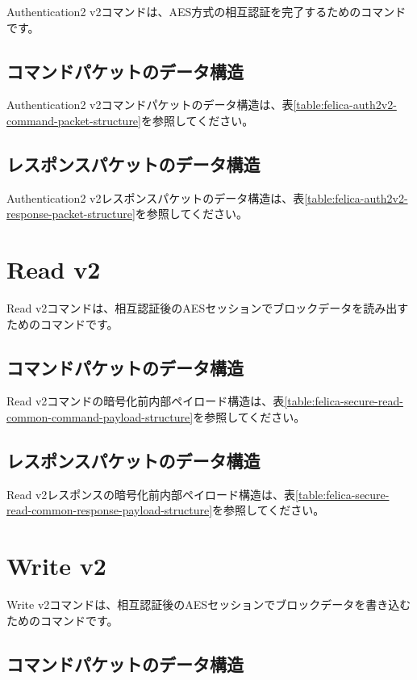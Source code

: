 \documentclass[a4paper]{report}
\begin{document}
Authentication2 v2コマンドは、AES方式の相互認証を完了するためのコマンドです。

\subsection{コマンドパケットのデータ構造}

Authentication2 v2コマンドパケットのデータ構造は、表\ref{table:felica-auth2v2-command-packet-structure}を参照してください。

\subsection{レスポンスパケットのデータ構造}

Authentication2 v2レスポンスパケットのデータ構造は、表\ref{table:felica-auth2v2-response-packet-structure}を参照してください。

\section{Read v2}

Read v2コマンドは、相互認証後のAESセッションでブロックデータを読み出すためのコマンドです。

\subsection{コマンドパケットのデータ構造}

Read v2コマンドの暗号化前内部ペイロード構造は、表\ref{table:felica-secure-read-common-command-payload-structure}を参照してください。

\subsection{レスポンスパケットのデータ構造}

Read v2レスポンスの暗号化前内部ペイロード構造は、表\ref{table:felica-secure-read-common-response-payload-structure}を参照してください。

\section{Write v2}

Write v2コマンドは、相互認証後のAESセッションでブロックデータを書き込むためのコマンドです。

\subsection{コマンドパケットのデータ構造}
\end{document}
